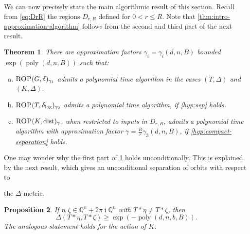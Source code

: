 \documentclass[10pt,a4paper]{article}
\newtheorem{theorem}{Theorem}[section]
\newtheorem{proposition}[theorem]{Proposition}
\theoremstyle{definition}
\newenvironment{alphaenumerate}{\begin{enumerate}[(a)]}{\end{enumerate}}
\DeclareMathOperator{\poly}{poly}
\DeclareMathOperator{\ii}{i}
\DeclareMathOperator{\dist}{dist}
\newcommand{\distLD}{\delta_{\log}}
\newcommand{\QQ}{\mathbb{Q}}
\numberwithin{equation}{section}
\begin{document}
We can now precisely state the main algorithmic result of this section.
Recall from \cref{eq:DrR} the regions $D_{r, R}$ defined for $0<r\leq R$.
Note that \cref{thm:intro-approximation-algorithm} follows from
the second and third part of the next result.


\begin{theorem}
\label{thm:gap-algorithms-main}
There are approximation factors $\gamma_i=\gamma_i(d,n,B)$
bounded $\exp(\poly(d,n,B))$ such that:
\begin{alphaenumerate}
\item\label{it:gap 3}
$\textsc{ROP}(G,\delta)_{\gamma_1}$ admits a polynomial time algorithm
in the cases $(T, \Delta)$ and $(K, \Delta)$.

\item\label{it:gap 1}
$\textsc{ROP}(T,\distLD)_{\gamma_2}$
admits a polynomial time algorithm,
if \cref{hyp:sep} holds.

\item\label{it:gap 2}
$\textsc{ROP}(K,\dist)_{\gamma}$, when restricted to inputs in $D_{r,R}$,
admits a polynomial time algorithm with
approximation factor $\gamma= \frac{R}{r}\gamma_3(d,n,B)$,
if \cref{hyp:compact-separation} holds.

\end{alphaenumerate}
\end{theorem}

One may wonder why the first part of \cref{thm:gap-algorithms-main}
holds unconditionally. This is explained by the next result, which
gives an unconditional separation of orbits with respect to

the $\Delta$-metric.

\begin{proposition}
\label{prop:logarithmic-separation}
If $\eta,\zeta\in\QQ^n+2\pi\ii\QQ^n$ with
$T\ast\eta\neq T\ast\zeta$, then
\[
 \Delta(T\ast\eta, T\ast\zeta) \ge \exp(-\poly(d,n,b,B)) .
\]
The analogous statement holds for the action of $K$.
\end{proposition}
\end{document}
